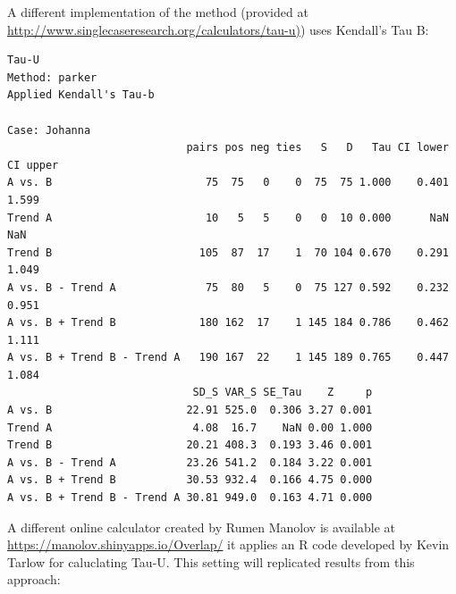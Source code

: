 \documentclass[
]{book}
\newenvironment{Shaded}{\begin{snugshade}}{\end{snugshade}}
\newcommand{\AttributeTok}[1]{\textcolor[rgb]{0.77,0.63,0.00}{#1}}
\newcommand{\ConstantTok}[1]{\textcolor[rgb]{0.00,0.00,0.00}{#1}}
\newcommand{\FunctionTok}[1]{\textcolor[rgb]{0.00,0.00,0.00}{#1}}
\newcommand{\NormalTok}[1]{#1}
\newcommand{\SpecialCharTok}[1]{\textcolor[rgb]{0.00,0.00,0.00}{#1}}
\newcommand{\StringTok}[1]{\textcolor[rgb]{0.31,0.60,0.02}{#1}}
\begin{document}
A different implementation of the method (provided at \href{http://www.singlecaseresearch.org/calculators/tau-u}{http://www.singlecaseresearch.org/calculators/tau-u)}) uses Kendall's Tau B:

\begin{Shaded}
\end{Shaded}

\begin{verbatim}
Tau-U
Method: parker 
Applied Kendall's Tau-b

Case: Johanna 
                            pairs pos neg ties   S   D   Tau CI lower CI upper
A vs. B                        75  75   0    0  75  75 1.000    0.401    1.599
Trend A                        10   5   5    0   0  10 0.000      NaN      NaN
Trend B                       105  87  17    1  70 104 0.670    0.291    1.049
A vs. B - Trend A              75  80   5    0  75 127 0.592    0.232    0.951
A vs. B + Trend B             180 162  17    1 145 184 0.786    0.462    1.111
A vs. B + Trend B - Trend A   190 167  22    1 145 189 0.765    0.447    1.084
                             SD_S VAR_S SE_Tau    Z     p
A vs. B                     22.91 525.0  0.306 3.27 0.001
Trend A                      4.08  16.7    NaN 0.00 1.000
Trend B                     20.21 408.3  0.193 3.46 0.001
A vs. B - Trend A           23.26 541.2  0.184 3.22 0.001
A vs. B + Trend B           30.53 932.4  0.166 4.75 0.000
A vs. B + Trend B - Trend A 30.81 949.0  0.163 4.71 0.000
\end{verbatim}

A different online calculator created by Rumen Manolov is available at \url{https://manolov.shinyapps.io/Overlap/} it applies an R code developed by Kevin Tarlow for caluclating Tau-U. This setting will replicated results from this approach:

\begin{Shaded}
\end{Shaded}
\end{document}
